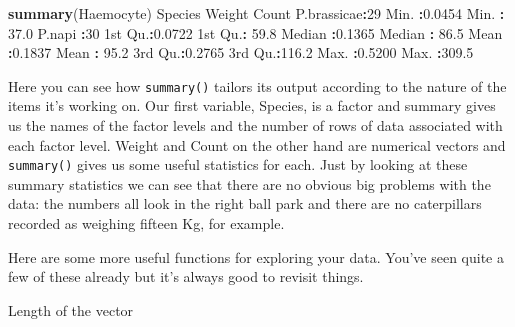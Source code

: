 \documentclass[
]{book}
\newenvironment{Shaded}{\begin{snugshade}}{\end{snugshade}}
\newcommand{\DecValTok}[1]{\textcolor[rgb]{0.00,0.00,0.81}{#1}}
\newcommand{\FloatTok}[1]{\textcolor[rgb]{0.00,0.00,0.81}{#1}}
\newcommand{\KeywordTok}[1]{\textcolor[rgb]{0.13,0.29,0.53}{\textbf{#1}}}
\newcommand{\NormalTok}[1]{#1}
\newcommand{\OperatorTok}[1]{\textcolor[rgb]{0.81,0.36,0.00}{\textbf{#1}}}
\newcommand{\StringTok}[1]{\textcolor[rgb]{0.31,0.60,0.02}{#1}}
\begin{document}
\begin{Shaded}
\begin{Highlighting}[]
\KeywordTok{summary}\NormalTok{(Haemocyte)}
\NormalTok{        Species       Weight           Count      }
\NormalTok{ P.brassicae}\OperatorTok{:}\DecValTok{29}\NormalTok{   Min.   }\OperatorTok{:}\FloatTok{0.0454}\NormalTok{   Min.   }\OperatorTok{:}\StringTok{ }\FloatTok{37.0}  
\NormalTok{ P.napi     }\OperatorTok{:}\DecValTok{30}\NormalTok{   1st Qu.}\OperatorTok{:}\FloatTok{0.0722}\NormalTok{   1st Qu.}\OperatorTok{:}\StringTok{ }\FloatTok{59.8}  
\NormalTok{                  Median }\OperatorTok{:}\FloatTok{0.1365}\NormalTok{   Median }\OperatorTok{:}\StringTok{ }\FloatTok{86.5}  
\NormalTok{                  Mean   }\OperatorTok{:}\FloatTok{0.1837}\NormalTok{   Mean   }\OperatorTok{:}\StringTok{ }\FloatTok{95.2}  
\NormalTok{                  3rd Qu.}\OperatorTok{:}\FloatTok{0.2765}\NormalTok{   3rd Qu.}\OperatorTok{:}\FloatTok{116.2}  
\NormalTok{                  Max.   }\OperatorTok{:}\FloatTok{0.5200}\NormalTok{   Max.   }\OperatorTok{:}\FloatTok{309.5}  
\end{Highlighting}
\end{Shaded}

Here you can see how \texttt{summary()} tailors its output according to the nature of the items it's working on. Our first variable, Species, is a factor and summary gives us the names of the factor levels and the number of rows of data associated with each factor level. Weight and Count on the other hand are numerical vectors and \texttt{summary()} gives us some useful statistics for each. Just by looking at these summary statistics we can see that there are no obvious big problems with the data: the numbers all look in the right ball park and there are no caterpillars recorded as weighing fifteen Kg, for example.

Here are some more useful functions for exploring your data. You've seen quite a few of these already but it's always good to revisit things.

\begin{Shaded}
\end{Shaded}

Length of the vector

\begin{Shaded}
\end{Shaded}
\end{document}
